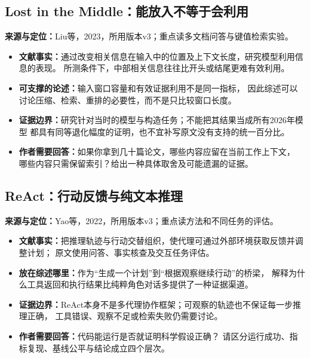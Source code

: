 \documentclass[UTF8,fontset=fandol,12pt,a4paper]{ctexart}
\begin{document}
\clearpage
\subsection{Lost in the Middle：能放入不等于会利用}
\noindent\textbf{来源与定位：}Liu等，2023，所用版本v3；重点读多文档问答与键值检索实验\cite{middle}。
\begin{itemize}
\item \textbf{文献事实：}通过改变相关信息在输入中的位置及上下文长度，研究模型利用信息的表现。
所测条件下，中部相关信息往往比开头或结尾更难有效利用。
\item \textbf{可支撑的论述：}输入窗口容量和有效证据利用不是同一指标，
因此综述可以讨论压缩、检索、重排的必要性，而不是只比较窗口长度。
\item \textbf{证据边界：}研究针对当时的模型与构造任务；不能把其结果当成所有2026年模型
都具有同等退化幅度的证明，也不宜补写原文没有支持的统一百分比。
\item \textbf{作者需要回答：}如果你拿到几十篇论文，哪些内容应留在当前工作上下文，
哪些内容只需保留索引？给出一种具体取舍及可能遗漏的证据。
\end{itemize}

\subsection{ReAct：行动反馈与纯文本推理}
\noindent\textbf{来源与定位：}Yao等，2022，所用版本v3；重点读方法和不同任务的评估\cite{react}。
\begin{itemize}
\item \textbf{文献事实：}把推理轨迹与行动交替组织，使代理可通过外部环境获取反馈并调整计划；
原文使用问答、事实核查及交互任务评估。
\item \textbf{放在综述哪里：}作为“生成一个计划”到“根据观察继续行动”的桥梁，
解释为什么工具返回和执行结果比纯粹角色对话多提供了一种证据渠道。
\item \textbf{证据边界：}ReAct本身不是多代理协作框架；可观察的轨迹也不保证每一步推理正确，
工具错误、观察不足或检索失败仍需要讨论。
\item \textbf{作者需要回答：}代码能运行是否就证明科学假设正确？
请区分运行成功、指标复现、基线公平与结论成立四个层次。
\end{itemize}

\clearpage
\end{document}
